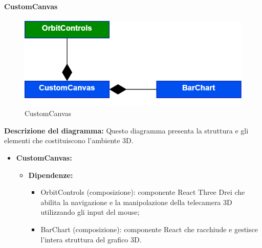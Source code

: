 \pagebreak

\paragraph{CustomCanvas}
\begin{figure}[h!] \centering
      \includegraphics[scale=0.3]{template/images/uml_front/ui/CustomCanvas.png}
      \caption{CustomCanvas}
\end{figure}
\textbf{Descrizione del diagramma:}
Questo diagramma presenta la struttura e gli elementi che costituiscono l'ambiente 3D.
\begin{itemize}
      \item \textbf{CustomCanvas:}
            \begin{itemize}
                  \item \textbf{Dipendenze:}
                        \begin{itemize}
                              \item OrbitControls (composizione): componente React Three Drei che abilita la
                                    navigazione e la manipolazione della telecamera 3D utilizzando gli input del
                                    mouse;
                              \item BarChart (composizione): componente React che racchiude e gestisce l'intera
                                    struttura del grafico 3D.
                        \end{itemize}
            \end{itemize}
\end{itemize}

